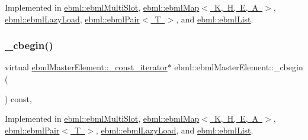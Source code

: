 Implemented in \mbox{\hyperlink{classebml_1_1ebmlMultiSlot_a61a2bb09ccbf771a9023774e0cdcbad2}{ebml\+::ebml\+Multi\+Slot}}, \mbox{\hyperlink{classebml_1_1ebmlMap_a1e395f6d3d365562e5bebc37b3cba8ef}{ebml\+::ebml\+Map$<$ K, H, E, A $>$}}, \mbox{\hyperlink{classebml_1_1ebmlLazyLoad_af2cd7290ff2924df057fec04ce25c3a4}{ebml\+::ebml\+Lazy\+Load}}, \mbox{\hyperlink{classebml_1_1ebmlPair_a1bd75b88b0b88d39a48283a2d8e9be4e}{ebml\+::ebml\+Pair$<$ T $>$}}, and \mbox{\hyperlink{classebml_1_1ebmlList_a95b8de53fe3688ba73ee488e8ca94566}{ebml\+::ebml\+List}}.

\mbox{\label{classebml_1_1ebmlMasterElement_a7e1ffa498e22b637a6671df14aa0bc45}} 
\subsubsection{\texorpdfstring{\+\_\+cbegin()}{\_cbegin()}}
{\footnotesize\ttfamily virtual \mbox{\hyperlink{classebml_1_1ebmlMasterElement_1_1__const__iterator}{ebml\+Master\+Element\+::\+\_\+const\+\_\+iterator}}$\ast$ ebml\+::ebml\+Master\+Element\+::\+\_\+cbegin (\begin{DoxyParamCaption}{ }\end{DoxyParamCaption}) const\hspace{0.3cm}{\ttfamily [protected]}, {}}



Implemented in \mbox{\hyperlink{classebml_1_1ebmlMultiSlot_adf1816c367909a1d265f38419febf9c7}{ebml\+::ebml\+Multi\+Slot}}, \mbox{\hyperlink{classebml_1_1ebmlMap_aa2f09d5ea0bf736dc32a4f04732fd4ba}{ebml\+::ebml\+Map$<$ K, H, E, A $>$}}, \mbox{\hyperlink{classebml_1_1ebmlPair_aa52de57679fd688de58ffebb225db68e}{ebml\+::ebml\+Pair$<$ T $>$}}, \mbox{\hyperlink{classebml_1_1ebmlLazyLoad_adf2cf9ae207edda065431aa55edcfa8e}{ebml\+::ebml\+Lazy\+Load}}, and \mbox{\hyperlink{classebml_1_1ebmlList_a7f215c99205ac37681fe7314463171bc}{ebml\+::ebml\+List}}.

\mbox{\label{classebml_1_1ebmlMasterElement_af4b802cb2b71b57215d6e0f25f9fa25e}} 
